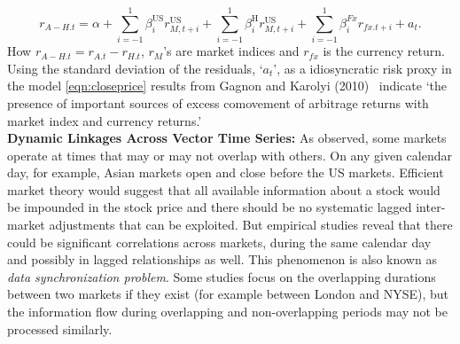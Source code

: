 	\begin{equation} \label{eqn:closeprice}
	r_{A-H.t}= \alpha + \sum_{i= -1}^1 \beta_i^{\text{US}} r_{M,t+i}^\text{US} + \sum_{i= -1}^1 \beta_i^\text{H} r_{M,t+i}^\text{US} + \sum_{i= -1}^1 \beta_i^{Fx} r_{fx.t+i} + a_t.
	\end{equation}
How $r_{A-H.t}= r_{A.t} - r_{H.t}$, $r_M$'s are market indices and $r_{fx}$ is the currency return. Using the standard deviation of the residuals, `$a_t$', as a idiosyncratic risk proxy in the model \eqref{eqn:closeprice} results from Gagnon and Karolyi (2010)~\cite{gagkar} indicate `the presence of important sources of excess comovement of arbitrage returns with market index and currency returns.' \\



\noindent \textbf{Dynamic Linkages Across Vector Time Series:} As observed, some markets operate at times that may or may not overlap with others. On any given calendar day, for example, Asian markets open and close before the US markets. Efficient market theory would suggest that all available information about a stock would be impounded in the stock price and there should be no systematic lagged inter-market adjustments that can be exploited. But empirical studies reveal that there could be significant correlations across markets, during the same calendar day and possibly in lagged relationships as well. This phenomenon is also known as \emph{data synchronization problem}. Some studies focus on the overlapping durations between two markets if they exist (for example between London and NYSE), but the information flow during overlapping and non-overlapping periods may not be processed similarly. 


